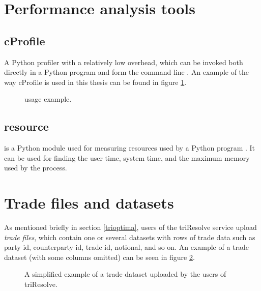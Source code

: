 \section{Performance analysis tools}
\subsection{cProfile}
A Python profiler with a relatively low overhead, which can be invoked both directly in a Python program and form the command line \cite{26_2tppp2d}.
An example of the way cProfile is used in this thesis can be found in figure \ref{fig:profiler_example}.

\begin{figure}[ht]
  \centering
  \caption{ usage example.}
  \label{fig:profiler_example}
\end{figure}

\subsection{resource}
 is a Python module used for measuring resources used by a Python program \cite{36_3rruip2d}. It can be used for finding the user time, system time,
and the maximum memory used by the process.

\section{Trade files and datasets}
As mentioned briefly in section \ref{trioptima}, users of the triResolve service upload \textit{trade files}, which contain one or several datasets with
rows of trade data such as party id, counterparty id, trade id, notional, and so on. An example of a trade dataset (with some columns omitted) can be seen in figure
\ref{fig:data_set_example}.

\begin{figure}[ht]
\centering
{}
\caption[Example of trade dataset]{A simplified example of a trade dataset uploaded by the users of triResolve.}
  \label{fig:data_set_example}
\end{figure}

